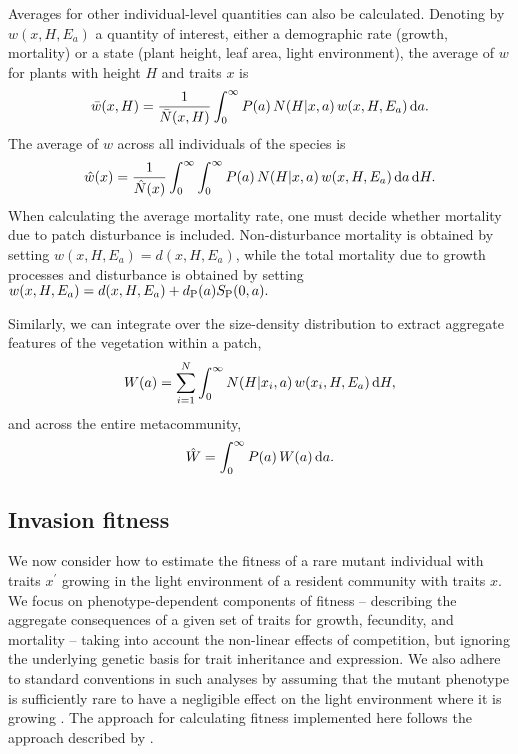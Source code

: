 \documentclass[10pt,twoside]{article}
\begin{document}
Averages for other individual-level quantities can also be calculated.
Denoting by
\(w(x, H, E_a)\) a quantity of interest, either a demographic rate
(growth, mortality) or a state (plant height, leaf area, light environment),
the average of \(w\) for plants with height $H$ and traits $x$ is
\begin{equation}\bar{w}(x, H) = \frac1{\bar{N}(x, H)}\int_{0}^{\infty}P(a) \, N(H | x, a) \, w(x, H, E_a) \, {\rm d}a.
\end{equation}
The average of \(w\) across all individuals of the species is
\begin{equation}
\hat{w}(x) = \frac1{\hat{N}(x) }\int_{0}^{\infty} \int_{0}^{\infty}P(a) \, N(H | x, a) \, w(x, H, E_a) \, {\rm d}a \, {\rm d}H.
\end{equation}
When calculating the average mortality rate, one must decide whether
mortality due to patch disturbance is included. Non-disturbance mortality
is obtained by setting \(w(x, H, E_a) = d(x, H, E_a)\), while the total
mortality due to growth processes and disturbance is obtained by setting
\(w(x, H, E_a) = d(x, H, E_a) + d_{\rm P}(a) S_{\rm P}(0, a).\)

Similarly, we can integrate over the size-density distribution to extract aggregate
features of the vegetation within a patch,
\begin{equation}
W(a) = \sum_{i = 1}^{N} \int_{0}^{\infty} N(H | x_i, a)\, w(x_i, H, E_a) \, {\rm d}H,
\end{equation}
and across the entire metacommunity,
\begin{equation}
\hat{W} = \int_{0}^{\infty} P(a) \, W(a) \, {\rm d}a.
\end{equation}

\subsection{Invasion fitness}\label{invasion-fitness}

We now consider how to estimate the fitness of a rare mutant individual
with traits \(x^\prime\) growing in the light environment of a resident
community with traits \(x\). We focus on phenotype-dependent components
of fitness -- describing the aggregate consequences of a given set of traits for growth,
fecundity, and mortality -- taking into account the non-linear effects of
competition, but ignoring the underlying genetic
basis for trait inheritance and expression. We also adhere to standard
conventions in such analyses by assuming that the mutant phenotype is sufficiently
rare to have a negligible effect on the light environment where it is growing \citep{Geritz-1998}.
The approach for calculating fitness implemented here follows the approach
described by \cite{Falster-2015}.
\end{document}
